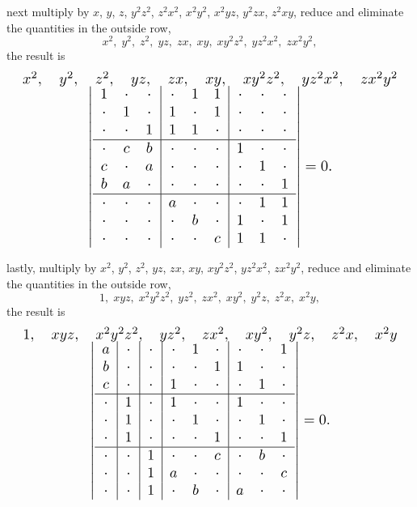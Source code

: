\documentclass[11pt]{article}
\begin{document}
\noindent next multiply by $x$, $y$, $z$, $y^{2}z^{2}$, $z^{2}x^{2}$, $x^{2}y^{2}$, $x^{2}yz$, $y^{2}zx$, $z^{2}xy$, reduce and eliminate the quantities in the outside row,
\[
x^{2},\; y^{2},\; z^{2},\; yz,\; zx,\; xy,\; xy^{2}z^{2},\; yz^{2}x^{2},\; zx^{2}y^{2},
\]
the result is
\[
\resizebox{\textwidth}{!}{%
$\begin{array}{c}
x^{2},\quad y^{2},\quad z^{2},\quad yz,\quad zx,\quad xy,\quad xy^{2}z^{2},\quad yz^{2}x^{2},\quad zx^{2}y^{2} \\[-0.2em]
\left|
\begin{array}{ccc|ccc|ccc}
1 & \cdot & \cdot & \cdot & 1 & 1 & \cdot & \cdot & \cdot \\
\cdot & 1 & \cdot & 1 & \cdot & 1 & \cdot & \cdot & \cdot \\
\cdot & \cdot & 1 & 1 & 1 & \cdot & \cdot & \cdot & \cdot \\
\hline
\cdot & c & b & \cdot & \cdot & \cdot & 1 & \cdot & \cdot \\
c & \cdot & a & \cdot & \cdot & \cdot & \cdot & 1 & \cdot \\
b & a & \cdot & \cdot & \cdot & \cdot & \cdot & \cdot & 1 \\
\hline
\cdot & \cdot & \cdot & a & \cdot & \cdot & \cdot & 1 & 1 \\
\cdot & \cdot & \cdot & \cdot & b & \cdot & 1 & \cdot & 1 \\
\cdot & \cdot & \cdot & \cdot & \cdot & c & 1 & 1 & \cdot
\end{array}
\right| = 0.
\end{array}$%
}
\]

\medskip

\noindent lastly, multiply by $x^{2}$, $y^{2}$, $z^{2}$, $yz$, $zx$, $xy$, $xy^{2}z^{2}$, $yz^{2}x^{2}$, $zx^{2}y^{2}$, reduce and eliminate the quantities in the outside row,
\[
1,\; xyz,\; x^{2}y^{2}z^{2},\; yz^{2},\; zx^{2},\; xy^{2},\; y^{2}z,\; z^{2}x,\; x^{2}y,
\]
the result is
\[
\resizebox{\textwidth}{!}{%
$\begin{array}{c}
1,\quad xyz,\quad x^{2}y^{2}z^{2},\quad yz^{2},\quad zx^{2},\quad xy^{2},\quad y^{2}z,\quad z^{2}x,\quad x^{2}y \\[-0.2em]
\left|
\begin{array}{c|c|c|ccc|ccc}
a & \cdot & \cdot & \cdot & 1 & \cdot & \cdot & \cdot & 1 \\
b & \cdot & \cdot & \cdot & \cdot & 1 & 1 & \cdot & \cdot \\
c & \cdot & \cdot & 1 & \cdot & \cdot & \cdot & 1 & \cdot \\
\hline
\cdot & 1 & \cdot & 1 & \cdot & \cdot & 1 & \cdot & \cdot \\
\cdot & 1 & \cdot & \cdot & 1 & \cdot & \cdot & 1 & \cdot \\
\cdot & 1 & \cdot & \cdot & \cdot & 1 & \cdot & \cdot & 1 \\
\hline
\cdot & \cdot & 1 & \cdot & \cdot & c & \cdot & b & \cdot \\
\cdot & \cdot & 1 & a & \cdot & \cdot & \cdot & \cdot & c \\
\cdot & \cdot & 1 & \cdot & b & \cdot & a & \cdot & \cdot
\end{array}
\right| = 0.
\end{array}$%
}
\]
\end{document}
